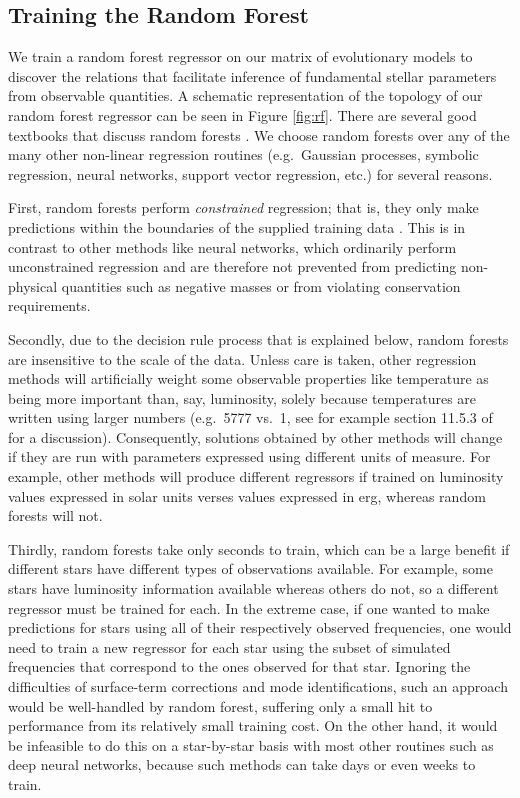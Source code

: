 \documentclass[twocolumn,twocolappendix]{aastex6}
\begin{document}
\subsection{Training the Random Forest} \label{sec:forest}
We train a random forest regressor on our matrix of evolutionary models to discover the relations that facilitate inference of fundamental stellar parameters from observable quantities. A schematic representation of the topology of our random forest regressor can be seen in Figure \ref{fig:rf}. There are several good textbooks that discuss random forests \citep[see e.g.][Chapter 15]{hastie2005elements}. We choose random forests over any of the many other non-linear regression routines (e.g.\ Gaussian processes, symbolic regression, neural networks, support vector regression, etc.) for several reasons. 

First, random forests perform \emph{constrained} regression; that is, they only make predictions within the boundaries of the supplied training data \citep[see e.g.][Section 9.2.1]{hastie2005elements}. This is in contrast to other methods like neural networks, which ordinarily perform unconstrained regression and are therefore not prevented from predicting non-physical quantities such as negative masses or from violating conservation requirements. 

Secondly, due to the decision rule process that is explained below, random forests are insensitive to the scale of the data. Unless care is taken, other regression methods will artificially weight some observable properties like temperature as being more important than, say, luminosity, solely because temperatures are written using larger numbers (e.g.\ 5777 vs.\ 1, see for example section 11.5.3 of \citealt{hastie2005elements} for a discussion). Consequently, solutions obtained by other methods will change if they are run with parameters expressed using different units of measure. For example, other methods will produce different regressors if trained on luminosity values expressed in solar units verses values expressed in erg, whereas random forests will not. 

Thirdly, random forests take only seconds to train, which can be a large benefit if different stars have different types of observations available. For example, some stars have luminosity information available whereas others do not, so a different regressor must be trained for each. In the extreme case, if one wanted to make predictions for stars using all of their respectively observed frequencies, one would need to train a new regressor for each star using the subset of simulated frequencies that correspond to the ones observed for that star. Ignoring the difficulties of surface-term corrections and mode identifications, such an approach would be well-handled by random forest, suffering only a small hit to performance from its relatively small training cost. On the other hand, it would be infeasible to do this on a star-by-star basis with most other routines such as deep neural networks, because such methods can take days or even weeks to train. 
\end{document}
